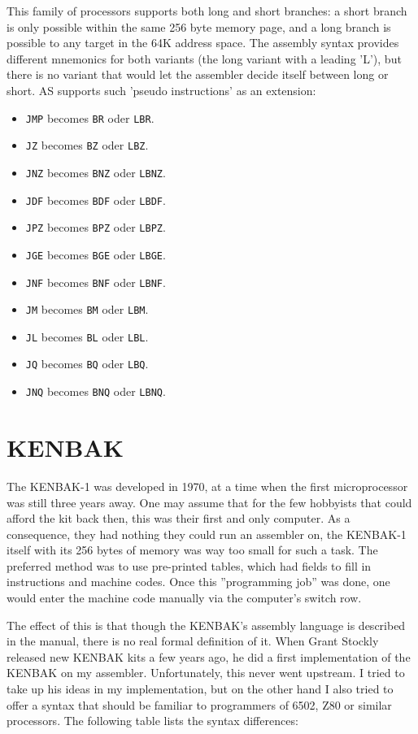 \documentclass[12pt,twoside]{report}
\newcommand{\tty}[1]{{\tt #1}}
\newcommand{\asname}{{AS}}
\begin{document}
This family of processors supports both long and short branches: a short
branch is only possible within the same 256 byte memory page, and a long branch
is possible to any target in the 64K address space.  The assembly syntax provides
different mnemonics for both variants (the long variant with a leading 'L'), but
there is no variant that would let the assembler decide itself between long
or short.  \asname{} supports such 'pseudo instructions' as an extension:
\begin{itemize}
\item{\tty{JMP} becomes \tty{BR} oder \tty{LBR}.}
\item{\tty{JZ} becomes \tty{BZ} oder \tty{LBZ}.}
\item{\tty{JNZ} becomes \tty{BNZ} oder \tty{LBNZ}.}
\item{\tty{JDF} becomes \tty{BDF} oder \tty{LBDF}.}
\item{\tty{JPZ} becomes \tty{BPZ} oder \tty{LBPZ}.}
\item{\tty{JGE} becomes \tty{BGE} oder \tty{LBGE}.}
\item{\tty{JNF} becomes \tty{BNF} oder \tty{LBNF}.}
\item{\tty{JM} becomes \tty{BM} oder \tty{LBM}.}
\item{\tty{JL} becomes \tty{BL} oder \tty{LBL}.}
\item{\tty{JQ} becomes \tty{BQ} oder \tty{LBQ}.}
\item{\tty{JNQ} becomes \tty{BNQ} oder \tty{LBNQ}.}
\end{itemize}



\section{KENBAK}

The KENBAK-1 was developed in 1970, at a time when the first microprocessor
was still three years away.  One may assume that for the few hobbyists that
could afford the kit back then, this was their first and only computer.  As
a consequence, they had nothing they could run an assembler on, the KENBAK-1 
itself with its 256 bytes of memory was way too small for such a task.  The
preferred method was to use pre-printed tables, which had fields to fill in
instructions and machine codes.  Once this ''programming job'' was done, one
would enter the machine code manually via the computer's switch row.

The effect of this is that though the KENBAK's assembly language is described
in the manual, there is no real formal definition of it.  When Grant Stockly
released new KENBAK kits a few years ago, he did a first implementation of the
KENBAK on my assembler.  Unfortunately, this never went upstream.  I tried
to take up his ideas in my implementation, but on the other hand I also tried to
offer a syntax that should be familiar to programmers of 6502, Z80 or similar
processors.  The following table lists the syntax differences:
\end{document}
